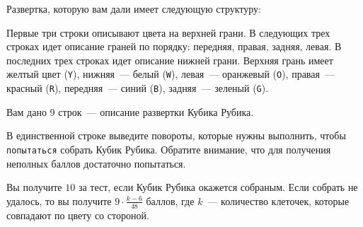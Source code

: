Развертка, которую вам дали имеет следующую структуру:

Первые три строки описывают цвета на верхней грани. В следующих трех строках идет описание граней по порядку:
передняя, правая, задняя, левая. В последних трех строках идет описание нижней грани. Верхняя грань имеет желтый цвет (\texttt{Y}),
нижняя~--- белый (\texttt{W}), левая~--- оранжевый (\texttt{O}), правая~--- красный (\texttt{R}), передняя~--- синий (\texttt{B}),
задняя~--- зеленый (\texttt{G}).

\Input
Вам дано 9 строк~--- описание развертки Кубика Рубика.

\Output
В единственной строке выведите повороты, которые нужны выполнить, чтобы \texttt{попытаться} собрать Кубик Рубика. Обратите внимание, что для получения
неполных баллов достаточно попытаться.

\Samples
\BeginTests
\EndTests

\Scoring
Вы получите $10$ за тест, если Кубик Рубика окажется собраным. Если собрать не удалось, то вы получите $9 \cdot \frac{k - 6}{48}$ баллов, где $k$~--- количество
клеточек, которые совпадают по цвету со стороной.

\EndProblem
